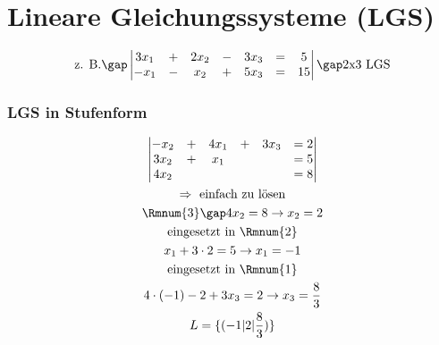 \section{Lineare Gleichungssysteme (LGS)}
\begin{gather*}
  \text{z. B.} \gap
  \begin{vmatrix}
    3x_1 & + & 2x_2 & - & 3x_3 & = & 5 \\
    -x_1 & - & x_2 & + & 5x_3 & = & 15
  \end{vmatrix}
  \gap \text{2x3 LGS}
\end{gather*}
\subsubsection{LGS in Stufenform}
\begin{gather*}
  \begin{vmatrix}
    -x_2 & + & 4x_1 & + & 3x_3 & = 2 \\
    3x_2 & + & x_1 &&&  = 5 \\
    4x_2 &&&&& = 8
  \end{vmatrix} \\
  \Rightarrow \text{ einfach zu lösen} \\
  \text{\Rmnum{3}} \gap 4x_2 = 8 \rightarrow x_2 = 2 \\
  \text{eingesetzt in \Rmnum{2}} \\
  x_1 + 3 \cdot 2 = 5 \rightarrow x_1 = -1 \\
  \text{eingesetzt in \Rmnum{1}} \\
  4 \cdot (-1) -2 + 3x_3 = 2 \rightarrow x_3 = \frac{8}{3} \\
  L = \{(-1|2|\frac{8}{3})\}
\end{gather*}
